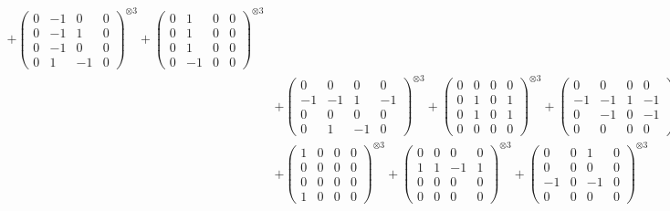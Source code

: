 \documentclass{article}
\begin{document}
{\begin{align}
            + \begin{pmatrix} 0 & -1 & 0 & 0 \\ 0 & -1 & 1 & 0 \\ 0 & -1 & 0 & 0 \\ 0 & 1 & -1 & 0 \end{pmatrix}^{\otimes 3} 
            + \begin{pmatrix} 0 & 1 & 0 & 0 \\ 0 & 1 & 0 & 0 \\ 0 & 1 & 0 & 0 \\ 0 & -1 & 0 & 0 \end{pmatrix}^{\otimes 3} \\
        &+ \label{Rs16-Rc11-Solution-9-c10} \begin{pmatrix} 0 & 0 & 0 & 0 \\ -1 & -1 & 1 & -1 \\ 0 & 0 & 0 & 0 \\ 0 & 1 & -1 & 0 \end{pmatrix}^{\otimes 3} 
            + \begin{pmatrix} 0 & 0 & 0 & 0 \\ 0 & 1 & 0 & 1 \\ 0 & 1 & 0 & 1 \\ 0 & 0 & 0 & 0 \end{pmatrix}^{\otimes 3} 
            + \begin{pmatrix} 0 & 0 & 0 & 0 \\ -1 & -1 & 1 & -1 \\ 0 & -1 & 0 & -1 \\ 0 & 0 & 0 & 0 \end{pmatrix}^{\otimes 3} \\
        &+ \label{Rs16-Rc11-Solution-9-c13} \begin{pmatrix} 1 & 0 & 0 & 0 \\ 0 & 0 & 0 & 0 \\ 0 & 0 & 0 & 0 \\ 1 & 0 & 0 & 0 \end{pmatrix}^{\otimes 3} 
            + \begin{pmatrix} 0 & 0 & 0 & 0 \\ 1 & 1 & -1 & 1 \\ 0 & 0 & 0 & 0 \\ 0 & 0 & 0 & 0 \end{pmatrix}^{\otimes 3} 
            + \begin{pmatrix} 0 & 0 & 1 & 0 \\ 0 & 0 & 0 & 0 \\ -1 & 0 & -1 & 0 \\ 0 & 0 & 0 & 0 \end{pmatrix}^{\otimes 3} \\

\end{align}}
\end{document}
